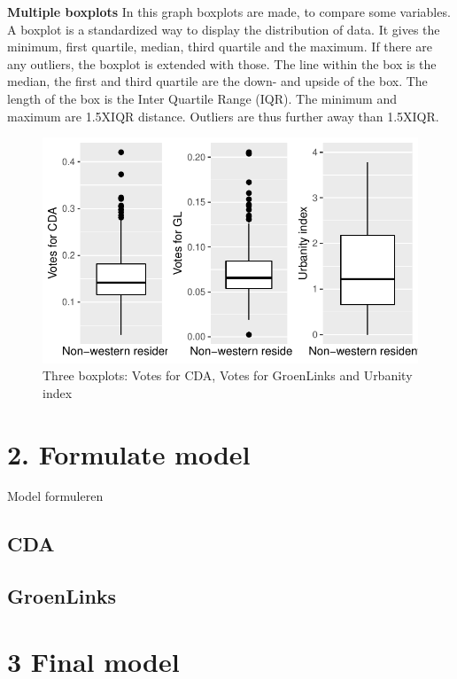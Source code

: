 \documentclass[11pt,]{article}
\begin{document}
\textbf{Multiple boxplots} In this graph boxplots are made, to compare
some variables. A boxplot is a standardized way to display the
distribution of data. It gives the minimum, first quartile, median,
third quartile and the maximum. If there are any outliers, the boxplot
is extended with those. The line within the box is the median, the first
and third quartile are the down- and upside of the box. The length of
the box is the Inter Quartile Range (IQR). The minimum and maximum are
1.5XIQR distance. Outliers are thus further away than 1.5XIQR.

\begin{figure}[H]

{\centering \includegraphics{Report_files/figure-latex/unnamed-chunk-8-1} 

}

\caption{Three boxplots: Votes for CDA, Votes for GroenLinks and Urbanity index}\label{fig:unnamed-chunk-8}
\end{figure}

\section{2. Formulate model}\label{formulate-model}

Model formuleren

\subsection{CDA}\label{cda}

\subsection{GroenLinks}\label{groenlinks}

\section{3 Final model}\label{final-model}
\end{document}
